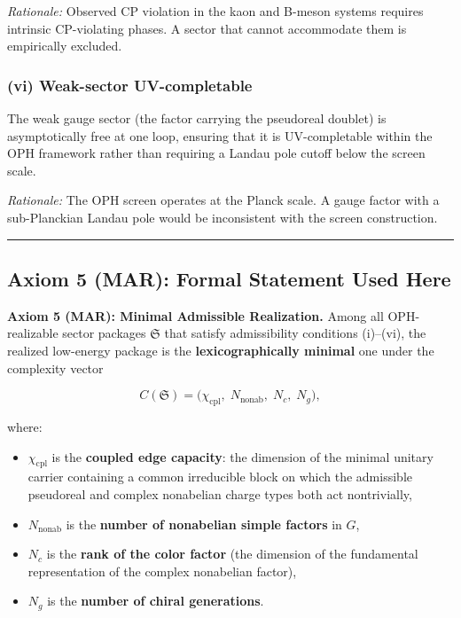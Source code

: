 \emph{Rationale:} Observed CP violation in the kaon and B-meson systems requires intrinsic CP-violating phases. A sector that cannot accommodate them is empirically excluded.

\subsubsection{(vi) Weak-sector UV-completable}\label{vi-weak-sector-uv-completable}

The weak gauge sector (the factor carrying the pseudoreal doublet) is asymptotically free at one loop, ensuring that it is UV-completable within the OPH framework rather than requiring a Landau pole cutoff below the screen scale.

\emph{Rationale:} The OPH screen operates at the Planck scale. A gauge factor with a sub-Planckian Landau pole would be inconsistent with the screen construction.

\begin{center}\rule{0.5\linewidth}{0.5pt}\end{center}

\subsection{Axiom 5 (MAR): Formal Statement Used Here}\label{3-selection-axiom-mar}

\textbf{Axiom 5 (MAR): Minimal Admissible Realization.} Among all OPH-realizable sector packages \(\mathfrak S\) that satisfy admissibility conditions (i)--(vi), the realized low-energy package is the \textbf{lexicographically minimal} one under the complexity vector

\[C(\mathfrak S) = \bigl(\chi_{\mathrm{cpl}},\; N_{\mathrm{nonab}},\; N_c,\; N_g\bigr),\]

where:

\begin{itemize}
\tightlist
\item
  \(\chi_{\mathrm{cpl}}\) is the \textbf{coupled edge capacity}: the dimension of the minimal unitary carrier containing a common irreducible block on which the admissible pseudoreal and complex nonabelian charge types both act nontrivially,
\item
  \(N_{\mathrm{nonab}}\) is the \textbf{number of nonabelian simple factors} in \(G\),
\item
  \(N_c\) is the \textbf{rank of the color factor} (the dimension of the fundamental representation of the complex nonabelian factor),
\item
  \(N_g\) is the \textbf{number of chiral generations}.
\end{itemize}

